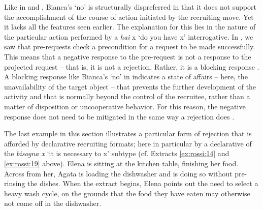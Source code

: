 \documentclass[output=paper,modfonts]{langscibook}
\begin{document}
Like in  and , Bianca's ‘no’ is structurally dispreferred in that it does not support the accomplishment of the course of action initiated by the recruiting move. Yet it lacks all the features seen earlier. The explanation for this lies in the nature of the particular action performed by a \textit{hai} x ‘do you have x’ interrogative. In , we saw that pre-requests check a precondition for a request to be made successfully. This means that a negative response to the pre-request is not a response to the projected request -- that is, it is not a rejection. Rather, it is a blocking response \citep[30]{Schegloff2007}. A blocking response like Bianca's ‘no’ in  indicates a state of affairs -- here, the unavailability of the target object -- that prevents the further development of the activity and that is normally beyond the control of the recruitee, rather than a matter of disposition or uncooperative behavior. For this reason, the negative response does not need to be mitigated in the same way a rejection does \citep{Rossi2015b}.

The last example in this section illustrates a particular form of rejection that is afforded by declarative recruiting formats; here in particular by a declarative of the \textit{bisogna x} ‘it is necessary to x’ subtype (cf. Extracts \ref{ex:rossi:14} and \ref{ex:rossi:19} above). Elena is sitting at the kitchen table, finishing her food. Across from her, Agata is loading the dishwasher and is doing so without pre-rinsing the dishes. When the extract begins, Elena points out the need to select a heavy wash cycle, on the grounds that the food they have eaten may otherwise not come off in the dishwasher. %
\end{document}
